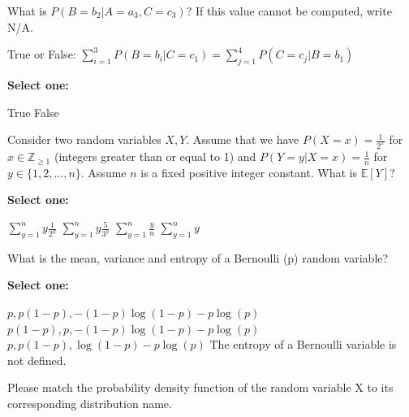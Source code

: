 \documentclass[11pt,addpoints,answers]{exam}
\numberwithin{equation}{section} %
\numberwithin{figure}{section} %
\numberwithin{table}{section} %
\begin{document}
\begin{questions}
    \begin{tcolorbox}[fit,height=1cm, width=2cm, blank, borderline={1pt}{-2pt},nobeforeafter]
    \end{tcolorbox}
    
    
    
    \question[2] What is $P(B=b_2 | A = a_3, C = c_3)$? If this value cannot be computed, write N/A.
    
    \begin{tcolorbox}[fit,height=1cm, width=2cm, blank, borderline={1pt}{-2pt},nobeforeafter]
    \end{tcolorbox}
    
    
        \question[2] True or False: $\sum_{i=1}^3 P(B=b_i|C=c_1) = \sum_{j=1}^4 P(C=c_j|B=b_1)$
    
    \textbf{Select one:}
    \begin{checkboxes}
        \choice True
        \choice False
    \end{checkboxes}
    
    
        
    \question[2] Consider two random variables $X, Y$. Assume that we have $P(X=x) = \frac{1}{2^x}$ for $x \in \mathbb{Z}_{\geq 1}$ (integers greater than or equal to 1) and $P(Y=y|X=x) = \frac{1}{n}$ for $y \in \{1,2,...,n\}$. Assume $n$ is a fixed positive integer constant. What is $\mathbb{E}[Y]$? 
    
    \textbf{Select one:}
    \begin{checkboxes}
        \choice $\sum_{y=1}^n y \frac{1}{2^y}$
        \choice $\sum_{y=1}^n y \frac{5}{3^y}$
        \choice $\sum_{y=1}^n \frac{y}{n}$
        \choice $\sum_{y=1}^n y$
    \end{checkboxes}
    
    
\clearpage

    \question[1] What is the mean, variance and entropy of a Bernoulli (p) random variable?
    
    \textbf{Select one:}
    \begin{checkboxes}
        \choice $p, p(1-p), -(1-p)\log(1-p)-p \log(p)$
        \choice $p(1-p), p, -(1-p)\log(1-p)-p\log(p)$
        \choice $p, p(1-p),\log(1-p)-p\log(p)$
        \choice The entropy of a Bernoulli variable is not defined.
    \end{checkboxes}
    


    \question[2] Please match the probability density function of the random variable X to its corresponding distribution name.
    

\end{questions}
\end{document}
